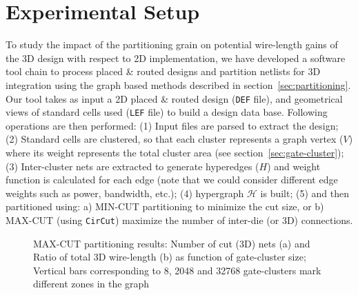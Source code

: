 \documentclass[conference]{IEEEtran}
\begin{document}
\section{Experimental Setup}\label{sec:setup}
To study the impact of the partitioning grain on potential wire-length gains of the 3D design with respect to 2D implementation, we have developed a software tool chain to process placed \& routed designs and partition netlists for 3D integration using the graph based methods described in section~\ref{sec:partitioning}. Our tool takes as input a 2D placed \& routed design (\texttt{DEF} file), and geometrical views of standard cells used (\texttt{LEF} file) to build a design data base. Following operations are then performed: (1) Input files are parsed to extract the design; (2) Standard cells are clustered, so that each cluster represents a graph vertex ($V$) where its weight represents the total cluster area (see section~\ref{sec:gate-cluster}); (3) Inter-cluster nets are extracted to generate hyperedges ($H$) and weight function is calculated for each edge (note that we could consider different edge weights such as power, bandwidth, etc.); (4) hypergraph $\mathcal{H}$ is built; (5) and then partitioned using: a) MIN-CUT partitioning to minimize the cut size, or b) MAX-CUT (using \texttt{CirCut}) maximize the number of inter-die (or 3D) connections.
\begin{figure}
\centering
{}
{}
\caption{MAX-CUT partitioning results: Number of cut (3D) nets (a) and Ratio of total 3D wire-length (b) as function of gate-cluster size; Vertical bars corresponding to 8, 2048 and 32768 gate-clusters mark different zones in the graph}
\label{fig:3Dnets}
\end{figure} 
\end{document}
